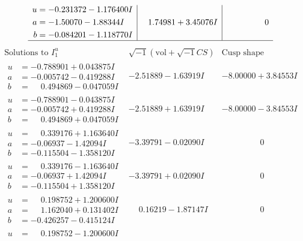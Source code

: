 \documentclass[1p]{elsarticle_modified}
\theoremstyle{definition}
\newcommand{\I}{\sqrt{-1}}
\begin{document}
$$\begin{array}{c|c|c}
\begin{aligned}
u &= -0.231372 - 1.176400 I \\
a &= -1.50070 - 1.88344 I \\
b &= -0.084201 - 1.118770 I\end{aligned}
 & \phantom{-}1.74981 + 3.45076 I & \phantom{-0.000000 } 0\\
 \hline 
 \end{array}$$\newpage$$\begin{array}{c|c|c}  
\text{Solutions to }I^u_{1}& \I (\text{vol} + \sqrt{-1}CS) & \text{Cusp shape}\\
 \hline 
\begin{aligned}
u &= -0.788901 + 0.043875 I \\
a &= -0.005742 - 0.419288 I \\
b &= \phantom{-}0.494869 - 0.047059 I\end{aligned}
 & -2.51889 - 1.63919 I & -8.00000 + 3.84553 I \\ \hline\begin{aligned}
u &= -0.788901 - 0.043875 I \\
a &= -0.005742 + 0.419288 I \\
b &= \phantom{-}0.494869 + 0.047059 I\end{aligned}
 & -2.51889 + 1.63919 I & -8.00000 - 3.84553 I \\ \hline\begin{aligned}
u &= \phantom{-}0.339176 + 1.163640 I \\
a &= -0.06937 - 1.42094 I \\
b &= -0.115504 - 1.358120 I\end{aligned}
 & -3.39791 - 0.02090 I & \phantom{-0.000000 } 0 \\ \hline\begin{aligned}
u &= \phantom{-}0.339176 - 1.163640 I \\
a &= -0.06937 + 1.42094 I \\
b &= -0.115504 + 1.358120 I\end{aligned}
 & -3.39791 + 0.02090 I & \phantom{-0.000000 } 0 \\ \hline\begin{aligned}
u &= \phantom{-}0.198752 + 1.200600 I \\
a &= \phantom{-}1.162040 + 0.131402 I \\
b &= -0.426257 - 0.415124 I\end{aligned}
 & \phantom{-}0.16219 - 1.87147 I & \phantom{-0.000000 } 0 \\ \hline\begin{aligned}
u &= \phantom{-}0.198752 - 1.200600 I \\

\end{aligned}
\end{array}$$
\end{document}
